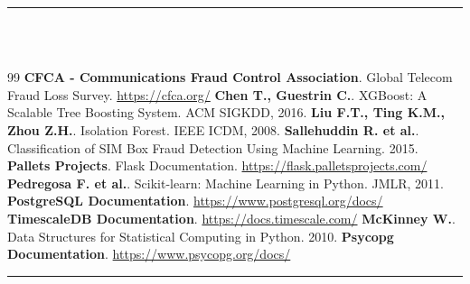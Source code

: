 \documentclass[12pt, oneside, a4paper]{report}
\newcommand{\chapterhead}[1]{%
  \noindent\rule[-0.2cm]{0.45cm}{1.2cm}\hspace{0.15cm}%
  \raisebox{0.85cm}{\rule{0.85\textwidth}{0.5pt}}\\[0.3cm]
  \noindent\hspace*{0.6cm}{\Huge\textbf{#1}}\\[1.5cm]
}
\begin{document}
\clearpage
\thispagestyle{fancy}

\noindent\rule[-0.2cm]{0.45cm}{1.2cm}\hspace{0.15cm}%
\raisebox{0.85cm}{\rule{0.85\textwidth}{0.5pt}}\\[0.3cm]
\noindent{}\\[0.5cm]

\begingroup
    \patchcmd{\thebibliography}{\clearpage}{}{}{}
    \patchcmd{\thebibliography}{\chapter*}{}{}{}
    
    \renewcommand{\bibname}{}

\begin{thebibliography}{99}
 \textbf{CFCA - Communications Fraud Control Association}. Global Telecom Fraud Loss Survey. \url{https://cfca.org/}
 \textbf{Chen T., Guestrin C.}. XGBoost: A Scalable Tree Boosting System. ACM SIGKDD, 2016.
 \textbf{Liu F.T., Ting K.M., Zhou Z.H.}. Isolation Forest. IEEE ICDM, 2008.
 \textbf{Sallehuddin R. et al.}. Classification of SIM Box Fraud Detection Using Machine Learning. 2015.
 \textbf{Pallets Projects}. Flask Documentation. \url{https://flask.palletsprojects.com/}
 \textbf{Pedregosa F. et al.}. Scikit-learn: Machine Learning in Python. JMLR, 2011.
 \textbf{PostgreSQL Documentation}. \url{https://www.postgresql.org/docs/}
 \textbf{TimescaleDB Documentation}. \url{https://docs.timescale.com/}
 \textbf{McKinney W.}. Data Structures for Statistical Computing in Python. 2010.
 \textbf{Psycopg Documentation}. \url{https://www.psycopg.org/docs/}
\end{thebibliography}

\clearpage
\thispagestyle{plain}
\chapterhead{ANNEXES}
\end{document}
